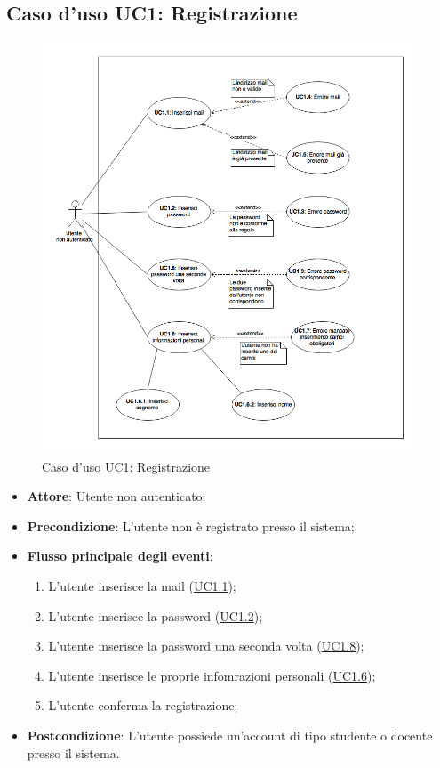\documentclass[12pt,a4paper]{article}
\begin{document}
\hypertarget{UC1}{}
\subsection{Caso d'uso UC1: Registrazione}
\begin{figure}[H]
	\centering
	\includegraphics[width=\textwidth]{diagramUC1.png}
	\caption{Caso d'uso UC1: Registrazione}\label{fig:UC1} 
\end{figure}
\begin{itemize}

\item \textbf{Attore}: Utente non autenticato; 
\item \textbf{Precondizione}: L’utente non è registrato presso il sistema;

\item \textbf{Flusso principale degli eventi}:
\begin{enumerate}
	\item L'utente inserisce la mail (\hyperlink{UC1.1}{UC1.1});
	\item L'utente inserisce la password (\hyperlink{UC1.2}{UC1.2});
	\item L'utente inserisce la password una seconda volta (\hyperlink{UC1.8}{UC1.8});
	\item L'utente inserisce le proprie infomrazioni personali (\hyperlink{UC1.6}{UC1.6});
	\item L'utente conferma la registrazione;
	
\end{enumerate}
\item \textbf{Postcondizione}: L’utente possiede un’account di tipo studente o docente presso il sistema.
\end{itemize}
\hypertarget{UC1.1}{}
\end{document}
